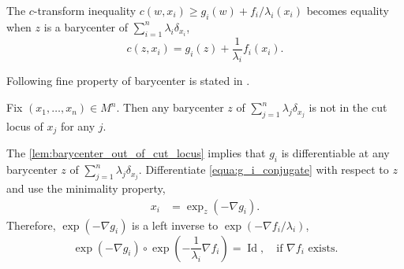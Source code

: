 The $c$-transform inequality
$ c(w, x_i) \geq g_i(w) + f_i / \lambda_i (x_i)$
becomes equality when $z$ is a barycenter of $\sum_{i=1}^{n} \lambda_i \delta_{x_i}$,
\begin{equation}
	\label{equa:g_i_conjugate}
	c(z, x_i) = g_i(z) + \frac{1}{\lambda_i} f_i(x_i).
\end{equation}

Following fine property of barycenter is stated in \cite[Lemma 3.1]{kim2015multi}.
\begin{lem}
	\label{lem:barycenter_out_of_cut_locus}
	Fix \( \left( x _ { 1 } , \ldots , x _ { n } \right) \in M^n\).
	Then any barycenter $z$ of $\sum_{j=1}^n \lambda_j \delta_{x_j}$
	is not in the cut locus of \( x _ { j } \) for any \( j . \)
\end{lem}

The \cref{lem:barycenter_out_of_cut_locus} implies that $g_i$ is differentiable at
any barycenter $z$ of $\sum_{j=1}^n \lambda_j \delta_{x_j}$.
Differentiate \cref{equa:g_i_conjugate} with respect to %
$z$ and use the minimality property,
\begin{align*}
	x_i & = \exp_{z}( - \nabla g_i).
\end{align*}
Therefore, $ \exp(- \nabla g_i) $ is a left inverse to $\exp( - \nabla f_i / \lambda_i)$,
\[
	\exp( - \nabla g_i) \circ \exp( - \frac{1}{\lambda_i} \nabla f_i) = \operatorname{Id},
	\quad \text{if } \nabla f_i \text{ exists}.
\]

